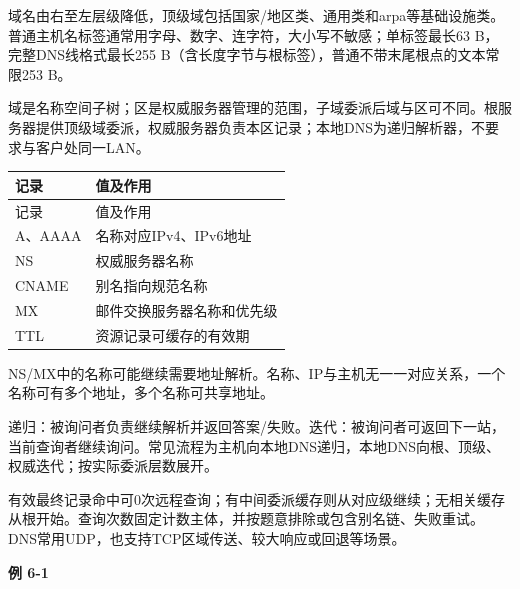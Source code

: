 域名由右至左层级降低，顶级域包括国家/地区类、通用类和arpa等基础设施类。普通主机名标签通常用字母、数字、连字符，大小写不敏感；单标签最长63 B，完整DNS线格式最长255 B（含长度字节与根标签），普通不带末尾根点的文本常限253 B。

域是名称空间子树；区是权威服务器管理的范围，子域委派后域与区可不同。根服务器提供顶级域委派，权威服务器负责本区记录；本地DNS为递归解析器，不要求与客户处同一LAN。

\par\smallskip
{\fontsize{9.3}{12}\selectfont\setlength{\tabcolsep}{2.5pt}\setlength{\LTleft}{0pt}\setlength{\LTright}{0pt}
\begin{longtable}{@{}>{\raggedright\arraybackslash}p{}>{\raggedright\arraybackslash}p{}@{}}
\toprule
记录 & 值及作用 \\

\midrule\endfirsthead\toprule
记录 & 值及作用 \\

\midrule\endhead\bottomrule\endfoot
A、AAAA & 名称对应IPv4、IPv6地址 \\

NS & 权威服务器名称 \\

CNAME & 别名指向规范名称 \\

MX & 邮件交换服务器名称和优先级 \\

TTL & 资源记录可缓存的有效期 \\

\end{longtable}}
\par\smallskip

NS/MX中的名称可能继续需要地址解析。名称、IP与主机无一一对应关系，一个名称可有多个地址，多个名称可共享地址。

递归：被询问者负责继续解析并返回答案/失败。迭代：被询问者可返回下一站，当前查询者继续询问。常见流程为主机向本地DNS递归，本地DNS向根、顶级、权威迭代；按实际委派层数展开。

有效最终记录命中可0次远程查询；有中间委派缓存则从对应级继续；无相关缓存从根开始。查询次数固定计数主体，并按题意排除或包含别名链、失败重试。DNS常用UDP，也支持TCP区域传送、较大响应或回退等场景。

\par\medskip{}\noindent\hypertarget{CN06-E01}{}\label{CN06-E01}\textbf{例 6-1}\par\nobreak\smallskip

